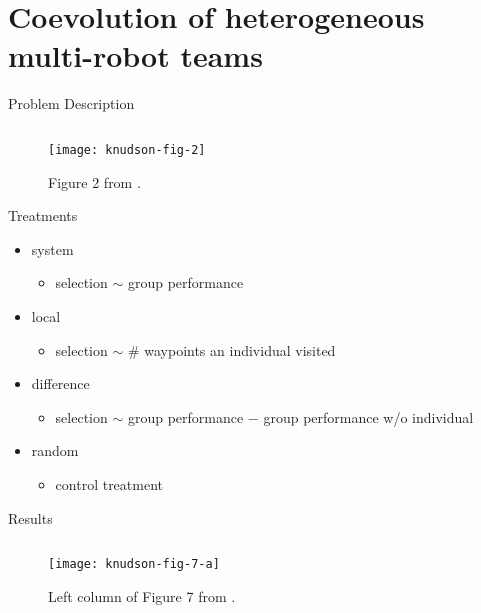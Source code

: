 \section{Coevolution of heterogeneous multi-robot teams \cite{knudson2010coevolution}}

\begin{frame}{Problem Description}

\begin{figure}

\begin{columns}
\begin{column}{0.7\textwidth}
\texttt{[image: knudson-fig-2]}
\end{column}
\begin{column}{0.3\textwidth}
\caption{
Figure 2 from \cite{knudson2010coevolution}.
}
\end{column}
\end{columns}
\end{figure}

\end{frame}

\begin{frame}{Treatments}
\Large
\begin{itemize}
\item system
\begin{itemize}
\item selection $\sim$ group performance
\end{itemize}
\item local
\begin{itemize}
\item selection $\sim$ \# waypoints an individual visited
\end{itemize}
\item difference
\begin{itemize}
\item selection $\sim$ group performance $-$ group performance w/o individual
\end{itemize}
\item random
\begin{itemize}
\item control treatment
\end{itemize}
\end{itemize}

\end{frame}

\begin{frame}{Results}

\begin{figure}

\begin{columns}
\begin{column}{0.7\textwidth}
\texttt{[image: knudson-fig-7-a]}
\end{column}
\begin{column}{0.3\textwidth}
\caption{
Left column of Figure 7 from \cite{knudson2010coevolution}.
}
\end{column}
\end{columns}

\end{figure}

\end{frame}

